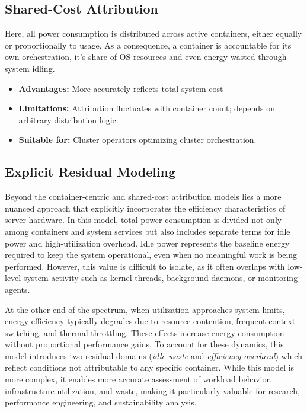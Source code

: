 \subsection{Shared-Cost Attribution}
\label{sec:shared-cost}

Here, all power consumption is distributed across active containers, either equally or proportionally to usage. As a consequence, a container is accountable for its own orchestration, it's share of OS resources and even energy wasted through system idling.

\begin{itemize}
    \item \textbf{Advantages:} More accurately reflects total system cost
    \item \textbf{Limitations:} Attribution fluctuates with container count; depends on arbitrary distribution logic.
    \item \textbf{Suitable for:} Cluster operators optimizing cluster orchestration.
\end{itemize}

\subsection{Explicit Residual Modeling}
\label{sec:residual-model}

Beyond the container-centric and shared-cost attribution models lies a more nuanced approach that explicitly incorporates the efficiency characteristics of server hardware. In this model, total power consumption is divided not only among containers and system services but also includes separate terms for idle power and high-utilization overhead. Idle power represents the baseline energy required to keep the system operational, even when no meaningful work is being performed. However, this value is difficult to isolate, as it often overlaps with low-level system activity such as kernel threads, background daemons, or monitoring agents.

At the other end of the spectrum, when utilization approaches system limits, energy efficiency typically degrades due to resource contention, frequent context switching, and thermal throttling\parencite{harchol2013performance}. These effects increase energy consumption without proportional performance gains. To account for these dynamics, this model introduces two residual domains (\textit{idle waste} and \textit{efficiency overhead}) which reflect conditions not attributable to any specific container. While this model is more complex, it enables more accurate assessment of workload behavior, infrastructure utilization, and waste, making it particularly valuable for research, performance engineering, and sustainability analysis.

